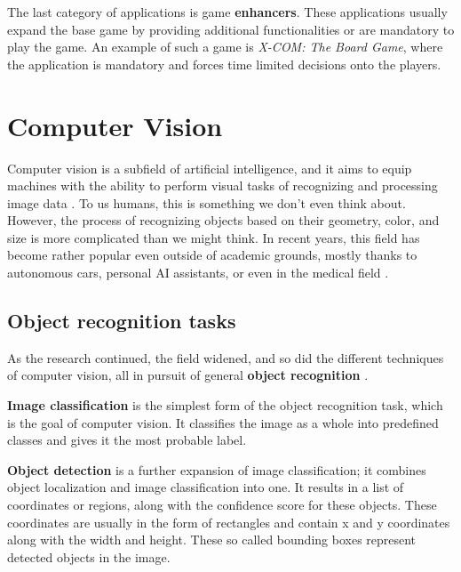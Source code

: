 The last category of applications is game \textbf{enhancers}. These applications usually expand the base game by providing additional functionalities or are mandatory to play the game. An example of such a game is \textit{X-COM: The Board Game}, where the application is mandatory and forces time limited decisions onto the players.




\section{Computer Vision}
\label{ComputerVision}
Computer vision is a subfield of artificial intelligence, and it aims to equip machines with the ability to perform visual tasks of recognizing and processing image data \cite{computerVisionIBM}. To us humans, this is something we don't even think about. However, the process of recognizing objects based on their geometry, color, and size is more complicated than we might think. In recent years, this field has become rather popular even outside of academic grounds, mostly thanks to autonomous cars, personal AI assistants, or even in the medical field \cite{computerVisionNX}.

\subsection{Object recognition tasks}
As the research continued, the field widened, and so did the different techniques of computer vision, all in pursuit of general \textbf{object recognition} \cite{computerVisionIBM}.

\textbf{Image classification} is the simplest form of the object recognition task, which is the goal of computer vision. It classifies the image as a whole into predefined classes and gives it the most probable label.

\textbf{Object detection} is a further expansion of image classification; it combines object localization and image classification into one. It results in a list of coordinates or regions, along with the confidence score for these objects. These coordinates are usually in the form of rectangles and contain x and y coordinates along with the width and height. These so called bounding boxes represent detected objects in the image.

